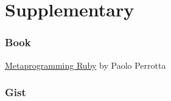 \documentclass[slidestop,compress,mathserif,notes]{beamer}
\begin{document}


\section{Supplementary} %
\label{sec:supplementary}

\begin{frame}
	\frametitle{Book}
	\underline{Metaprogramming Ruby} by Paolo Perrotta
\end{frame}

\begin{frame}
	\frametitle{Gist}
	
	
\end{frame}

\end{document}
